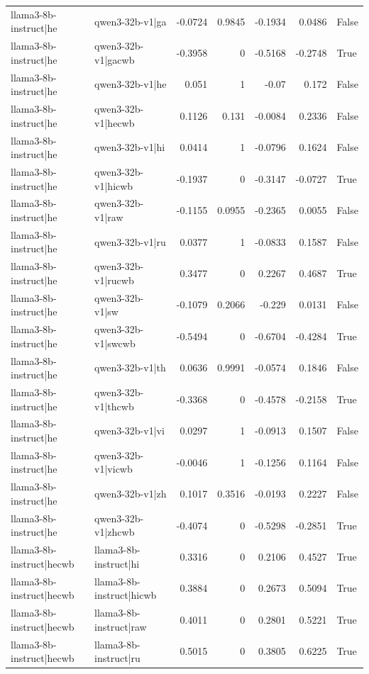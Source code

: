 \begin{table}
\begin{tabular}{l l r r r r l}
llama3-8b-instruct|he & qwen3-32b-v1|ga & -0.0724 & 0.9845 & -0.1934 & 0.0486 & False \\
llama3-8b-instruct|he & qwen3-32b-v1|gacwb & -0.3958 & 0 & -0.5168 & -0.2748 & True \\
llama3-8b-instruct|he & qwen3-32b-v1|he & 0.051 & 1 & -0.07 & 0.172 & False \\
llama3-8b-instruct|he & qwen3-32b-v1|hecwb & 0.1126 & 0.131 & -0.0084 & 0.2336 & False \\
llama3-8b-instruct|he & qwen3-32b-v1|hi & 0.0414 & 1 & -0.0796 & 0.1624 & False \\
llama3-8b-instruct|he & qwen3-32b-v1|hicwb & -0.1937 & 0 & -0.3147 & -0.0727 & True \\
llama3-8b-instruct|he & qwen3-32b-v1|raw & -0.1155 & 0.0955 & -0.2365 & 0.0055 & False \\
llama3-8b-instruct|he & qwen3-32b-v1|ru & 0.0377 & 1 & -0.0833 & 0.1587 & False \\
llama3-8b-instruct|he & qwen3-32b-v1|rucwb & 0.3477 & 0 & 0.2267 & 0.4687 & True \\
llama3-8b-instruct|he & qwen3-32b-v1|sw & -0.1079 & 0.2066 & -0.229 & 0.0131 & False \\
llama3-8b-instruct|he & qwen3-32b-v1|swcwb & -0.5494 & 0 & -0.6704 & -0.4284 & True \\
llama3-8b-instruct|he & qwen3-32b-v1|th & 0.0636 & 0.9991 & -0.0574 & 0.1846 & False \\
llama3-8b-instruct|he & qwen3-32b-v1|thcwb & -0.3368 & 0 & -0.4578 & -0.2158 & True \\
llama3-8b-instruct|he & qwen3-32b-v1|vi & 0.0297 & 1 & -0.0913 & 0.1507 & False \\
llama3-8b-instruct|he & qwen3-32b-v1|vicwb & -0.0046 & 1 & -0.1256 & 0.1164 & False \\
llama3-8b-instruct|he & qwen3-32b-v1|zh & 0.1017 & 0.3516 & -0.0193 & 0.2227 & False \\
llama3-8b-instruct|he & qwen3-32b-v1|zhcwb & -0.4074 & 0 & -0.5298 & -0.2851 & True \\
llama3-8b-instruct|hecwb & llama3-8b-instruct|hi & 0.3316 & 0 & 0.2106 & 0.4527 & True \\
llama3-8b-instruct|hecwb & llama3-8b-instruct|hicwb & 0.3884 & 0 & 0.2673 & 0.5094 & True \\
llama3-8b-instruct|hecwb & llama3-8b-instruct|raw & 0.4011 & 0 & 0.2801 & 0.5221 & True \\
llama3-8b-instruct|hecwb & llama3-8b-instruct|ru & 0.5015 & 0 & 0.3805 & 0.6225 & True \\

\end{tabular}
\end{table}
